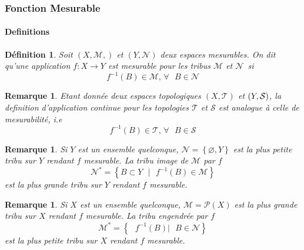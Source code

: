 \documentclass[3pt]{article}
\newtheorem{definition}[theorem]{D\'{e}finition}
\newtheorem{remark}[theorem]{Remarque}
\begin{document}
\bigskip

\subsubsection{Fonction Mesurable}

\bigskip

\paragraph{Definitions}

\bigskip

\begin{definition}
Soit $(X,\mathcal{M},)$ et $(Y,\mathcal{N})$ deux espaces mesurables. On dit
qu'une application $f:X\rightarrow Y$ est mesurable pour les tribus $%
\mathcal{M}$ et $\mathcal{N}$\ si 
\begin{equation*}
f^{-1}(B)\in \mathcal{M}\text{, }\forall \text{ }B\in \mathcal{N}
\end{equation*}
\end{definition}

\bigskip

\begin{remark}
Etant donn\'{e}e deux espaces topologiques $(X,\mathcal{T})$ et $(Y,\mathcal{%
S})$, la definition d'application continue pour les topologies $\mathcal{T}$
et $\mathcal{S}$ est analogue \`{a} celle de mesurabilit\'{e}, i.e%
\begin{equation*}
f^{-1}(B)\in \mathcal{T}\text{, }\forall \text{ }B\in \mathcal{S}
\end{equation*}
\end{remark}

\bigskip

\begin{remark}
Si $Y$ est un ensemble quelconque, $\mathcal{N=}\left\{ \varnothing
,Y\right\} $ est la plus petite tribu sur $Y$ rendant $f$ mesurable. La
tribu image de $\mathcal{M}$ par $f\ $%
\begin{equation*}
\mathcal{N}^{\ast }\mathcal{=}\left\{ B\subset Y\text{ }|\text{ }%
f^{-1}(B)\in \mathcal{M}\right\}
\end{equation*}%
est la plus grande tribu sur $Y$ rendant $f$ mesurable.
\end{remark}

\bigskip

\begin{remark}
Si $X$ est un ensemble quelconque, $\mathcal{M=P}(X)$ est la plus grande
tribu sur $X$ rendant $f$ mesurable. La tribu engendr\'{e}e par $f\ $%
\begin{equation*}
\mathcal{M}^{\ast }\mathcal{=}\left\{ \text{ }f^{-1}(B)|\text{ }B\in 
\mathcal{N}\right\}
\end{equation*}%
est la plus petite tribu sur $X$ rendant $f$ mesurable.
\end{remark}
\end{document}
